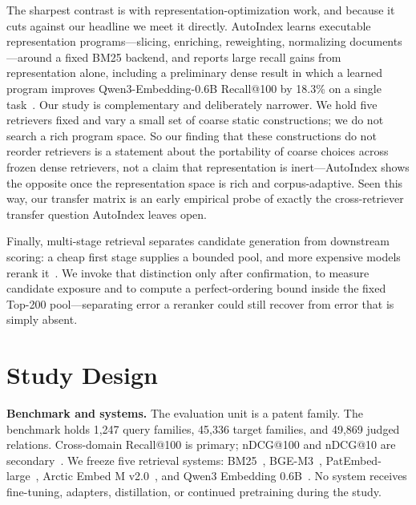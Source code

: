 \documentclass[a4paper,conference]{IEEEtran}
\begin{document}
The sharpest contrast is with representation-optimization work, and because it cuts against our headline we meet it directly. AutoIndex learns executable representation programs---slicing, enriching, reweighting, normalizing documents---around a fixed BM25 backend, and reports large recall gains from representation alone, including a preliminary dense result in which a learned program improves Qwen3-Embedding-0.6B Recall@100 by 18.3\% on a single task~\cite{onuallain2026autoindex}. Our study is complementary and deliberately narrower. We hold five retrievers fixed and vary a small set of coarse static constructions; we do not search a rich program space. So our finding that these constructions do not reorder retrievers is a statement about the portability of coarse choices across frozen dense retrievers, not a claim that representation is inert---AutoIndex shows the opposite once the representation space is rich and corpus-adaptive. Seen this way, our transfer matrix is an early empirical probe of exactly the cross-retriever transfer question AutoIndex leaves open.

Finally, multi-stage retrieval separates candidate generation from downstream scoring: a cheap first stage supplies a bounded pool, and more expensive models rerank it~\cite{asadi2013candidate,nogueira2019passage}. We invoke that distinction only after confirmation, to measure candidate exposure and to compute a perfect-ordering bound inside the fixed Top-200 pool---separating error a reranker could still recover from error that is simply absent.

\section{Study Design}

\textbf{Benchmark and systems.} The evaluation unit is a patent family. The benchmark holds 1,247 query families, 45,336 target families, and 49,869 judged relations. Cross-domain Recall@100 is primary; nDCG@100 and nDCG@10 are secondary~\cite{jarvelin2002cumulated}. We freeze five retrieval systems: BM25~\cite{robertson2009probabilistic}, BGE-M3~\cite{chen2024bgem3}, PatEmbed-large~\cite{ayaou2025patenteb}, Arctic Embed M v2.0~\cite{yu2024arctic}, and Qwen3 Embedding 0.6B~\cite{zhang2025qwen3}. No system receives fine-tuning, adapters, distillation, or continued pretraining during the study.
\end{document}
